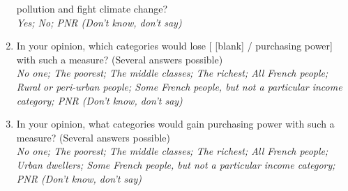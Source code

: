 \documentclass[12pt]{article} %
\begin{document}
\begin{appendices}
\begin{enumerate}[resume,leftmargin=*]
pollution and fight climate change? \emph{}\\
\emph{Yes; No; PNR (Don't know, don't say)}
\item In your opinion, which categories would lose {[} {[}blank{]} / purchasing
power{]} with such a measure? (Several answers possible) \emph{}\\
\emph{No one; The poorest; The middle classes; The richest; All French
people; Rural or peri-urban people; Some French people, but not a
particular income category; PNR (Don't know, don't say)} 
\item In your opinion, what categories would gain purchasing power with
such a measure? (Several answers possible) \emph{}\\
\emph{No one; The poorest; The middle classes; The richest; All French
people; Urban dwellers; Some French people, but not a particular income
category; PNR (Don't know, don't say)} 
\end{enumerate}


\end{appendices}
\end{document}
